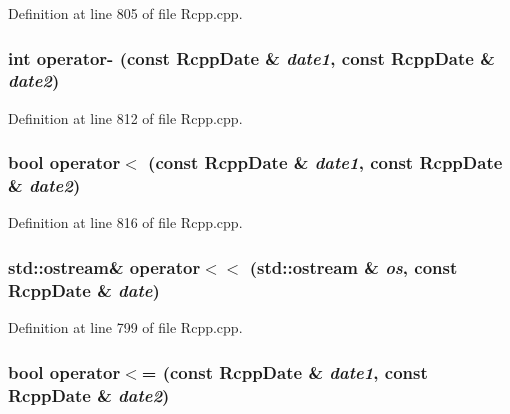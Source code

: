Definition at line 805 of file Rcpp.cpp.\hypertarget{classRcppDate_49241820910c75948937f70f76c0849d}{
\subsubsection[{operator-}]{\setlength{\rightskip}{0pt plus 5cm}int operator- (const {\bf RcppDate} \& {\em date1}, \/  const {\bf RcppDate} \& {\em date2})}}
\label{classRcppDate_49241820910c75948937f70f76c0849d}




Definition at line 812 of file Rcpp.cpp.\hypertarget{classRcppDate_f852d3a1ad52776201f385be5ea18c71}{
\subsubsection[{operator$<$}]{\setlength{\rightskip}{0pt plus 5cm}bool operator$<$ (const {\bf RcppDate} \& {\em date1}, \/  const {\bf RcppDate} \& {\em date2})}}
\label{classRcppDate_f852d3a1ad52776201f385be5ea18c71}




Definition at line 816 of file Rcpp.cpp.\hypertarget{classRcppDate_62c075d47528a48e5fb57c1855c4d71c}{
\subsubsection[{operator$<$$<$}]{\setlength{\rightskip}{0pt plus 5cm}std::ostream\& operator$<$$<$ (std::ostream \& {\em os}, \/  const {\bf RcppDate} \& {\em date})}}
\label{classRcppDate_62c075d47528a48e5fb57c1855c4d71c}




Definition at line 799 of file Rcpp.cpp.\hypertarget{classRcppDate_594132f5ef49b4f477d32289ced4df83}{
\subsubsection[{operator$<$=}]{\setlength{\rightskip}{0pt plus 5cm}bool operator$<$= (const {\bf RcppDate} \& {\em date1}, \/  const {\bf RcppDate} \& {\em date2})}}
\label{classRcppDate_594132f5ef49b4f477d32289ced4df83}




